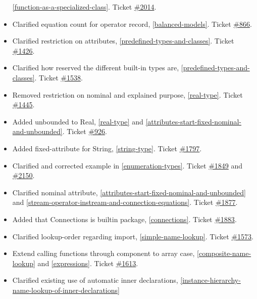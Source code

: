 \begin{itemize}
  \autoref{function-as-a-specialized-class}. Ticket
  \href{https://trac.modelica.org/Modelica/ticket/2014}{\#2014}.
\item
  Clarified equation count for operator record, \autoref{balanced-models}. Ticket
  \href{https://trac.modelica.org/Modelica/ticket/866}{\#866}.
\item
  Clarified restriction on attributes, \autoref{predefined-types-and-classes}. Ticket
  \href{https://trac.modelica.org/Modelica/ticket/1426}{\#1426}.
\item
  Clarified how reserved the different built-in types are, \autoref{predefined-types-and-classes}.
  Ticket \href{https://trac.modelica.org/Modelica/ticket/1538}{\#1538}.
\item
  Removed restriction on nominal and explained purpose, \autoref{real-type}.
  Ticket \href{https://trac.modelica.org/Modelica/ticket/1445}{\#1445}.
\item
  Added unbounded to Real, \autoref{real-type} and \autoref{attributes-start-fixed-nominal-and-unbounded}. Ticket
  \href{https://trac.modelica.org/Modelica/ticket/926}{\#926}.
\item
  Added fixed-attribute for String, \autoref{string-type}. Ticket
  \href{https://trac.modelica.org/Modelica/ticket/1797}{\#1797}.
\item
  Clarified and corrected example in \autoref{enumeration-types}. Ticket
  \href{https://trac.modelica.org/Modelica/ticket/1849}{\#1849} and
  \href{https://trac.modelica.org/Modelica/ticket/2150}{\#2150}.
\item
  Clarified nominal attribute, \autoref{attributes-start-fixed-nominal-and-unbounded} 
  and \autoref{stream-operator-instream-and-connection-equations}. Ticket
  \href{https://trac.modelica.org/Modelica/ticket/1877}{\#1877}.
\item
  Added that Connections is builtin package, \autoref{connections}. Ticket
  \href{https://trac.modelica.org/Modelica/ticket/1883}{\#1883}.
\item
  Clarified lookup-order regarding import, \autoref{simple-name-lookup}. Ticket
  \href{https://trac.modelica.org/Modelica/ticket/1573}{\#1573}.
\item
  Extend calling functions through component to array case, \autoref{composite-name-lookup} and \autoref{expressions}. Ticket
  \href{https://trac.modelica.org/Modelica/ticket/1613}{\#1613}.
\item
  Clarified existing use of automatic inner declarations, \autoref{instance-hierarchy-name-lookup-of-inner-declarations}

\end{itemize}
